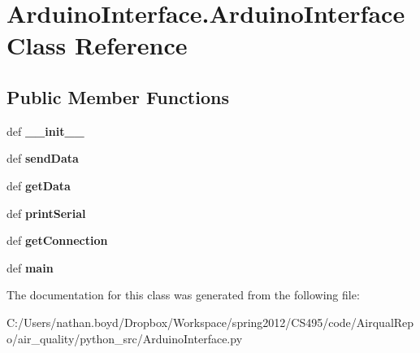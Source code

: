 \hypertarget{class_arduino_interface_1_1_arduino_interface}{\section{Arduino\-Interface.\-Arduino\-Interface Class Reference}
\label{class_arduino_interface_1_1_arduino_interface}
}
\subsection*{Public Member Functions}
\begin{DoxyCompactItemize}
\item 
\hypertarget{class_arduino_interface_1_1_arduino_interface_ad0063b90161fa8323cef433a13bb6e8b}{def {\bfseries \-\_\-\-\_\-init\-\_\-\-\_\-}}\label{class_arduino_interface_1_1_arduino_interface_ad0063b90161fa8323cef433a13bb6e8b}

\item 
\hypertarget{class_arduino_interface_1_1_arduino_interface_aa292ce6b4406b3e975e703502cca0e39}{def {\bfseries send\-Data}}\label{class_arduino_interface_1_1_arduino_interface_aa292ce6b4406b3e975e703502cca0e39}

\item 
\hypertarget{class_arduino_interface_1_1_arduino_interface_ae1ac3ad21ffe702a7b97ac3e05a22fc0}{def {\bfseries get\-Data}}\label{class_arduino_interface_1_1_arduino_interface_ae1ac3ad21ffe702a7b97ac3e05a22fc0}

\item 
\hypertarget{class_arduino_interface_1_1_arduino_interface_af07f9f858c6274d9cc1247c7dd14ebf6}{def {\bfseries print\-Serial}}\label{class_arduino_interface_1_1_arduino_interface_af07f9f858c6274d9cc1247c7dd14ebf6}

\item 
\hypertarget{class_arduino_interface_1_1_arduino_interface_a0e311cf3263799415c2ff536c7b42cf8}{def {\bfseries get\-Connection}}\label{class_arduino_interface_1_1_arduino_interface_a0e311cf3263799415c2ff536c7b42cf8}

\item 
\hypertarget{class_arduino_interface_1_1_arduino_interface_ac215fb8000c089a566d70f1b59c272b3}{def {\bfseries main}}\label{class_arduino_interface_1_1_arduino_interface_ac215fb8000c089a566d70f1b59c272b3}

\end{DoxyCompactItemize}


The documentation for this class was generated from the following file\-:\begin{DoxyCompactItemize}
\item 
C\-:/\-Users/nathan.\-boyd/\-Dropbox/\-Workspace/spring2012/\-C\-S495/code/\-Airqual\-Repo/air\-\_\-quality/python\-\_\-src/Arduino\-Interface.\-py\end{DoxyCompactItemize}
